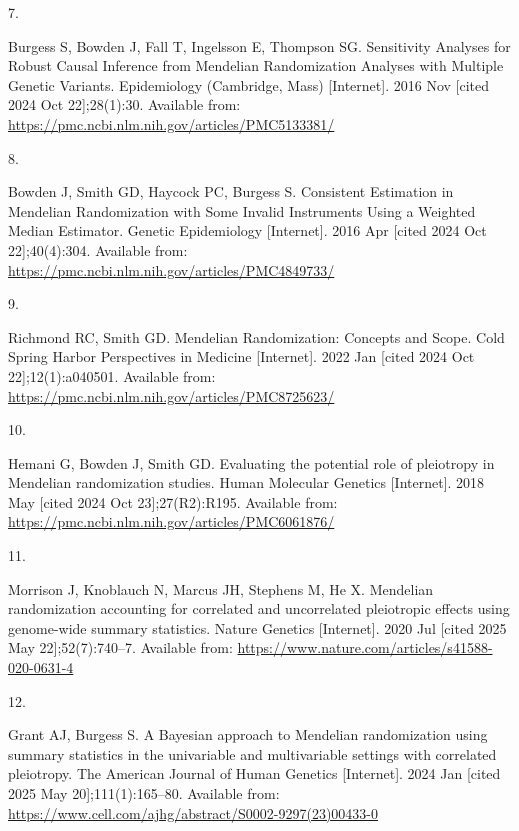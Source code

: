 \documentclass[
]{article}
\newlength{\cslhangindent}
\newlength{\csllabelwidth}
\newenvironment{CSLReferences}[2] %
 {\begin{list}{}{%
  \setlength{\itemindent}{0pt}
  \setlength{\leftmargin}{0pt}
  \setlength{\parsep}{0pt}
  \ifodd #1
   \setlength{\leftmargin}{\cslhangindent}
   \setlength{\itemindent}{-1\cslhangindent}
  \fi
  \setlength{\itemsep}{#2\baselineskip}}}
 {\end{list}}
\newcommand{\CSLLeftMargin}[1]{\parbox[t]{\csllabelwidth}{\strut#1\strut}}
\newcommand{\CSLRightInline}[1]{\parbox[t]{\linewidth - \csllabelwidth}{\strut#1\strut}}
\begin{document}
\begin{CSLReferences}{0}{1}
\CSLLeftMargin{7. }%
\CSLRightInline{Burgess S, Bowden J, Fall T, Ingelsson E, Thompson SG. Sensitivity {Analyses} for {Robust} {Causal} {Inference} from {Mendelian} {Randomization} {Analyses} with {Multiple} {Genetic} {Variants}. Epidemiology (Cambridge, Mass) {[}Internet{]}. 2016 Nov {[}cited 2024 Oct 22{]};28(1):30. Available from: \url{https://pmc.ncbi.nlm.nih.gov/articles/PMC5133381/}}

\CSLLeftMargin{8. }%
\CSLRightInline{Bowden J, Smith GD, Haycock PC, Burgess S. Consistent {Estimation} in {Mendelian} {Randomization} with {Some} {Invalid} {Instruments} {Using} a {Weighted} {Median} {Estimator}. Genetic Epidemiology {[}Internet{]}. 2016 Apr {[}cited 2024 Oct 22{]};40(4):304. Available from: \url{https://pmc.ncbi.nlm.nih.gov/articles/PMC4849733/}}

\CSLLeftMargin{9. }%
\CSLRightInline{Richmond RC, Smith GD. Mendelian {Randomization}: {Concepts} and {Scope}. Cold Spring Harbor Perspectives in Medicine {[}Internet{]}. 2022 Jan {[}cited 2024 Oct 22{]};12(1):a040501. Available from: \url{https://pmc.ncbi.nlm.nih.gov/articles/PMC8725623/}}

\CSLLeftMargin{10. }%
\CSLRightInline{Hemani G, Bowden J, Smith GD. Evaluating the potential role of pleiotropy in {Mendelian} randomization studies. Human Molecular Genetics {[}Internet{]}. 2018 May {[}cited 2024 Oct 23{]};27(R2):R195. Available from: \url{https://pmc.ncbi.nlm.nih.gov/articles/PMC6061876/}}

\CSLLeftMargin{11. }%
\CSLRightInline{Morrison J, Knoblauch N, Marcus JH, Stephens M, He X. Mendelian randomization accounting for correlated and uncorrelated pleiotropic effects using genome-wide summary statistics. Nature Genetics {[}Internet{]}. 2020 Jul {[}cited 2025 May 22{]};52(7):740--7. Available from: \url{https://www.nature.com/articles/s41588-020-0631-4}}

\CSLLeftMargin{12. }%
\CSLRightInline{Grant AJ, Burgess S. A {Bayesian} approach to {Mendelian} randomization using summary statistics in the univariable and multivariable settings with correlated pleiotropy. The American Journal of Human Genetics {[}Internet{]}. 2024 Jan {[}cited 2025 May 20{]};111(1):165--80. Available from: \url{https://www.cell.com/ajhg/abstract/S0002-9297(23)00433-0}}


\end{CSLReferences}
\end{document}
